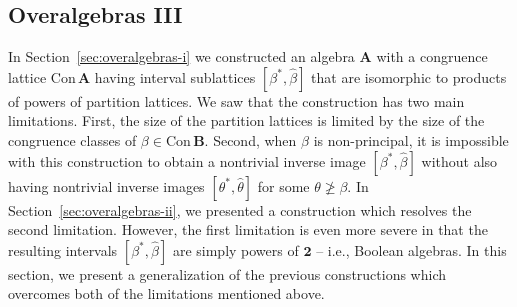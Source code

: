 \documentclass[cm,dissertation,actual,final]{uhthesis}
\theoremstyle{plain}
\theoremstyle{definition}
\theoremstyle{remark}
\numberwithin{theorem}{section}
\numberwithin{claim}{chapter}
\numberwithin{equation}{section}
\numberwithin{conjecture}{chapter}
\newcommand{\<}{\ensuremath{\langle}}
\renewcommand{\>}{\ensuremath{\rangle}}
\renewcommand{\ngeq}{\ensuremath{\ngeqslant}}
\newcommand{\Con}{\ensuremath{\mathrm{Con\,}}}
\newcommand{\htheta}{\ensuremath{\hat{\theta}}}
\newcommand{\0}{\ensuremath{\mathbf{0}}}
\newcommand{\1}{\ensuremath{\mathbf{1}}}
\newcommand{\2}{\ensuremath{\mathbf{2}}}
\newcommand{\3}{\ensuremath{\mathbf{3}}}
\newcommand{\4}{\ensuremath{\mathbf{4}}}
\newcommand{\5}{\ensuremath{\mathbf{5}}}
\newcommand{\bA}{\ensuremath{\mathbf{A}}}
\newcommand{\bB}{\ensuremath{\mathbf{B}}}
\newcommand{\two}{\ensuremath{\mathbf{2}}}
\newcommand{\hbeta}{\ensuremath{\widehat{\beta}}}
\begin{document}
\subsection{Overalgebras III}
\label{sec:overalgebras-iii}
In Section~\ref{sec:overalgebras-i} we  constructed an algebra $\bA$ with
a congruence lattice $\Con \bA$ having interval sublattices $[\beta^*, \hbeta]$
that are isomorphic to products of powers of partition lattices.  We saw that the
construction has two main limitations.  First, the size of the partition
lattices is limited by the size of the congruence classes of $\beta \in
\Con\bB$.  Second, when $\beta$ is non-principal, it is impossible with this
construction to obtain a nontrivial inverse image $[\beta^*, \hbeta]$ without
also having nontrivial inverse images $[\theta^*, \htheta]$ for some $\theta \ngeq
\beta$.  In Section~\ref{sec:overalgebras-ii}, we presented a construction which
resolves the second limitation. However, the first limitation is even more
severe in that the resulting intervals $[\beta^*, \hbeta]$ are simply powers of
$\two$ -- i.e., Boolean algebras.  In this section, we present a generalization
of the previous constructions which overcomes both of the limitations mentioned above.
\end{document}

